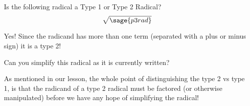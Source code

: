 \documentclass{ximera}
\begin{document}
\begin{problem}
    Is the following radical a Type 1 or Type 2 Radical?
    \[
        \sqrt{\sage{p3rad}}
    \]
    
    \begin{multipleChoice}
    \end{multipleChoice}
    \begin{feedback}[correct]
        Yes! Since the radicand has more than one term (separated with a plus or minus sign) it is a type 2!
    \end{feedback}
        
    \begin{problem}
        Can you simplify this radical as it is currently written?
        \begin{multipleChoice}
        \end{multipleChoice}
        \begin{feedback}[correct]
            As mentioned in our lesson, the whole point of distinguishing the type 2 vs type 1, is that the radicand of a type 2 radical must be factored (or otherwise manipulated) before we have any hope of simplifying the radical!
        \end{feedback}
    \end{problem}
\end{problem}
\end{document}
